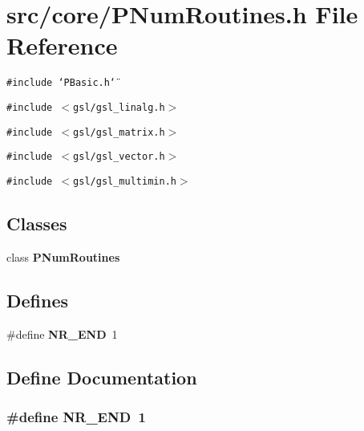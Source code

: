 \section{src/core/PNum\-Routines.h File Reference}
\label{PNumRoutines_8h}


{\tt \#include \char`\"{}PBasic.h\char`\"{}}\par
{\tt \#include $<$gsl/gsl\_\-linalg.h$>$}\par
{\tt \#include $<$gsl/gsl\_\-matrix.h$>$}\par
{\tt \#include $<$gsl/gsl\_\-vector.h$>$}\par
{\tt \#include $<$gsl/gsl\_\-multimin.h$>$}\par
\subsection*{Classes}
\begin{CompactItemize}
\item 
class {\bf PNum\-Routines}
\end{CompactItemize}
\subsection*{Defines}
\begin{CompactItemize}
\item 
\#define {\bf NR\_\-END}~1
\end{CompactItemize}


\subsection{Define Documentation}
\subsubsection{\setlength{\rightskip}{0pt plus 5cm}\#define NR\_\-END~1}\label{PNumRoutines_8h_86182f4c182c4912e585bbcc462838b1}


